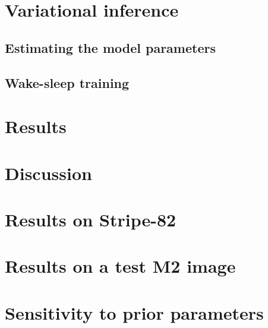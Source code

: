 \documentclass[12pt]{article}
\begin{document}
\section{Variational inference}
\label{sec:var_inference}


\subsection{Estimating the model parameters}
\label{sec:model_params}


\subsection{Wake-sleep training}
\label{sec:wake_sleep}


% 

\section{Results}
\label{sec:results}




\section{Discussion}
\label{sec:discussion}





\appendix
\section{Results on Stripe-82}


\section{Results on a test M2 image}


\section{Sensitivity to prior parameters}



\end{document}
